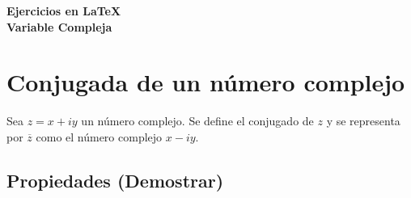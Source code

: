 \documentclass{article}
\title{}
\author{Miyerlan Velasquez}
\date{}
\theoremstyle{definition}
\begin{document}
    \begin{center}
        \large \bf Ejercicios en \LaTeX
        \\
        \bf Variable Compleja
    \end{center}
    
    \vspace{1cm}
    \section{Conjugada de un número complejo}
    Sea $z = x+iy$ un número complejo. Se define el conjugado de $z$ y se representa por $\overline{z}$ como el número complejo $x-iy$.
    \subsection{Propiedades (Demostrar)}
\end{document}
